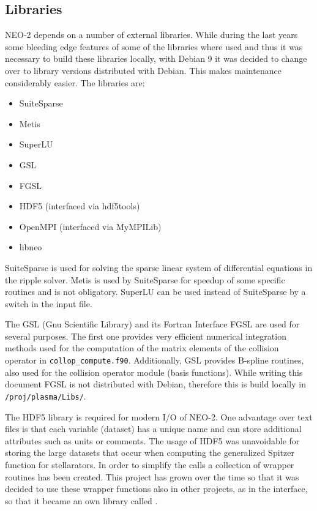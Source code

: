 \documentclass{article}
\newcommand{\vv}[1]{\texttt{\detokenize{#1}}}
\begin{document}
\subsection{Libraries}
NEO-2 depends on a number of external libraries. While during the last
years some bleeding edge features of some of the libraries where used
and thus it was necessary to build these libraries locally, with
Debian 9 it was decided to change over to library versions distributed
with Debian. This makes maintenance considerably easier. The libraries
are:
\begin{itemize}
\item SuiteSparse
\item Metis
\item SuperLU
\item GSL
\item FGSL
\item HDF5 (interfaced via hdf5tools)
\item OpenMPI (interfaced via MyMPILib)
\item libneo
\end{itemize}

SuiteSparse is used for solving the sparse linear system of differential
equations in the ripple solver. Metis is used by SuiteSparse for speedup
of some specific routines and is not obligatory. SuperLU can be used
instead of SuiteSparse by a switch in the input file.

The GSL (Gnu Scientific Library) and its Fortran Interface FGSL are used
for several purposes. The first one provides very efficient numerical
integration methods used for the computation of the matrix elements of
the collision operator in \verb|collop_compute.f90|. Additionally, GSL
provides B-spline routines, also used for the collision operator module
(basis functions). While writing this document FGSL is not distributed
with Debian, therefore this is build locally in \verb|/proj/plasma/Libs/|.

The HDF5 library is required for modern I/O of NEO-2. One advantage over
text files is that each variable (dataset) has a unique name and can
store additional attributes such as units or comments. The usage of HDF5
was unavoidable for storing the large datasets that occur when computing
the generalized Spitzer function for stellarators. In order to simplify
the calls a collection of wrapper routines has been created. This
project has grown over the time so that it was decided to use these
wrapper functions also in other projects, as in the interface, so that
it became an own library called \vv{hdf5tools}.
\end{document}
